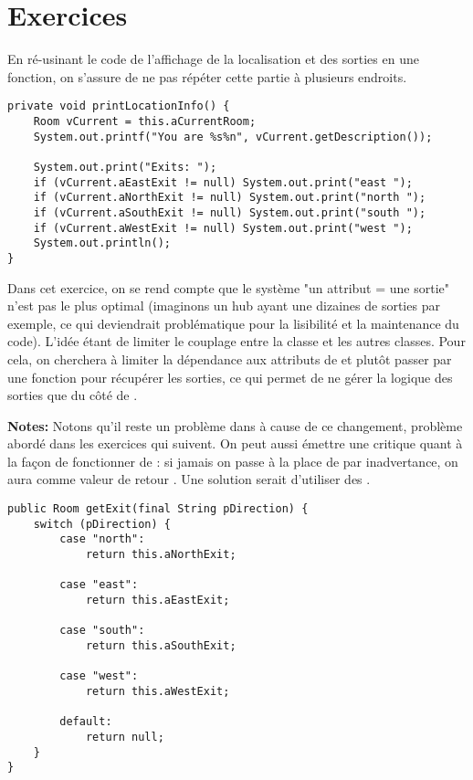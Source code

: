 \chapter{Exercices}

\setcounter{section}{7}
\setcounter{exercise}{4}

\begin{exercise}[subtitle=printLocationInfo]

En ré-usinant le code de l'affichage de la localisation et des sorties en une fonction, on s'assure de ne pas répéter cette partie à plusieurs endroits.

\begin{verbatim}
private void printLocationInfo() {
    Room vCurrent = this.aCurrentRoom;
    System.out.printf("You are %s%n", vCurrent.getDescription());
   
    System.out.print("Exits: ");
    if (vCurrent.aEastExit != null) System.out.print("east ");
    if (vCurrent.aNorthExit != null) System.out.print("north ");
    if (vCurrent.aSouthExit != null) System.out.print("south ");
    if (vCurrent.aWestExit != null) System.out.print("west ");
    System.out.println();
}
\end{verbatim}
\end{exercise}

\begin{exercise}[subtitle=getExit]

Dans cet exercice, on se rend compte que le système "un attribut = une sortie" n'est pas le plus optimal (imaginons un hub ayant une dizaines de sorties par exemple, ce qui deviendrait problématique pour la lisibilité et la maintenance du code). L'idée étant de limiter le couplage entre la classe  et les autres classes. Pour cela, on cherchera à limiter la dépendance aux attributs de  et plutôt passer par une fonction pour récupérer les sorties, ce qui permet de ne gérer la logique des sorties que du côté de .

\textbf{Notes:} Notons qu'il reste un problème dans  à cause de ce changement, problème abordé dans les exercices qui suivent. On peut aussi émettre une critique quant à la façon de fonctionner de : si jamais on passe  à la place de  par inadvertance, on aura comme valeur de retour . Une solution serait d'utiliser des .

\begin{verbatim}
public Room getExit(final String pDirection) {
    switch (pDirection) {
        case "north":
            return this.aNorthExit;

        case "east":
            return this.aEastExit;

        case "south":
            return this.aSouthExit;

        case "west":
            return this.aWestExit;

        default:
            return null;
    }
}
\end{verbatim}
\end{exercise}

